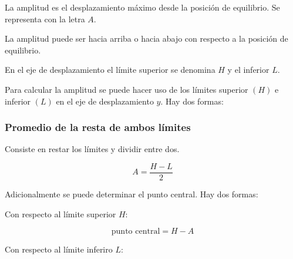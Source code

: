 La amplitud es el desplazamiento máximo desde la posición de equilibrio. Se representa con la letra $A$.

La amplitud puede ser hacia arriba o hacia abajo con respecto a la posición de equilibrio.

En el eje de desplazamiento el límite superior se denomina $H$ y el inferior $L$.

{
\centering
{}
}

Para calcular la amplitud se puede hacer uso de los límites superior $(H)$ e inferior $(L)$ en el eje de desplazamiento $y$. Hay dos formas:

\subsubsection{Promedio de la resta de ambos límites}

Consiste en restar los límites y dividir entre dos.

\[
  A=\dfrac{H-L}{2}
\]

Adicionalmente se puede determinar el punto central. Hay dos formas:

Con respecto al límite superior $H$:

\[
  \text{punto central}=H-A
\]

Con respecto al límite inferiro $L$:

